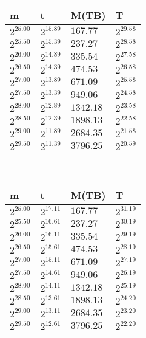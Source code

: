 \begin{tabular}{llll}
m & t & M(TB) & T \\ \hline
$2^{25.00}$ & $2^{15.89}$ & $167.77$ & $2^{29.58}$ \\
$2^{25.50}$ & $2^{15.39}$ & $237.27$ & $2^{28.58}$ \\
$2^{26.00}$ & $2^{14.89}$ & $335.54$ & $2^{27.58}$ \\
$2^{26.50}$ & $2^{14.39}$ & $474.53$ & $2^{26.58}$ \\
$2^{27.00}$ & $2^{13.89}$ & $671.09$ & $2^{25.58}$ \\
$2^{27.50}$ & $2^{13.39}$ & $949.06$ & $2^{24.58}$ \\
$2^{28.00}$ & $2^{12.89}$ & $1342.18$ & $2^{23.58}$ \\
$2^{28.50}$ & $2^{12.39}$ & $1898.13$ & $2^{22.58}$ \\
$2^{29.00}$ & $2^{11.89}$ & $2684.35$ & $2^{21.58}$ \\
$2^{29.50}$ & $2^{11.39}$ & $3796.25$ & $2^{20.59}$ \\
\end{tabular}
 \ 
\begin{tabular}{llll}
m & t & M(TB) & T \\ \hline
$2^{25.00}$ & $2^{17.11}$ & $167.77$ & $2^{31.19}$ \\
$2^{25.50}$ & $2^{16.61}$ & $237.27$ & $2^{30.19}$ \\
$2^{26.00}$ & $2^{16.11}$ & $335.54$ & $2^{29.19}$ \\
$2^{26.50}$ & $2^{15.61}$ & $474.53$ & $2^{28.19}$ \\
$2^{27.00}$ & $2^{15.11}$ & $671.09$ & $2^{27.19}$ \\
$2^{27.50}$ & $2^{14.61}$ & $949.06$ & $2^{26.19}$ \\
$2^{28.00}$ & $2^{14.11}$ & $1342.18$ & $2^{25.19}$ \\
$2^{28.50}$ & $2^{13.61}$ & $1898.13$ & $2^{24.20}$ \\
$2^{29.00}$ & $2^{13.11}$ & $2684.35$ & $2^{23.20}$ \\
$2^{29.50}$ & $2^{12.61}$ & $3796.25$ & $2^{22.20}$ \\
\end{tabular}
 \ 
